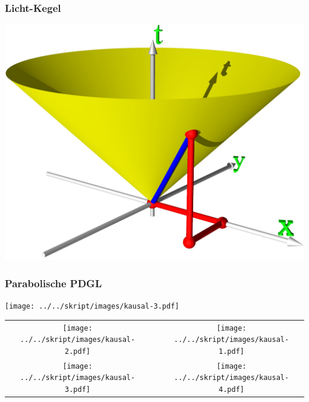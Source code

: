 \documentclass{beamer}
\begin{document}
\begin{frame}
\frametitle{Licht-Kegel}
\begin{center}
\includegraphics[width=\hsize]{lichtkegel.jpg}
\end{center}
\end{frame}

\begin{frame}
\frametitle{Parabolische PDGL}
\begin{center}
\texttt{[image: ../../skript/images/kausal-3.pdf]}
\end{center}
\end{frame}

\begin{frame}
\begin{center}
\begin{tabular}{ccc}
\texttt{[image: ../../skript/images/kausal-2.pdf]}&&
\texttt{[image: ../../skript/images/kausal-1.pdf]}\\
\texttt{[image: ../../skript/images/kausal-3.pdf]}&&
\texttt{[image: ../../skript/images/kausal-4.pdf]}
\end{tabular}
\end{center}
\end{frame}
\end{document}
